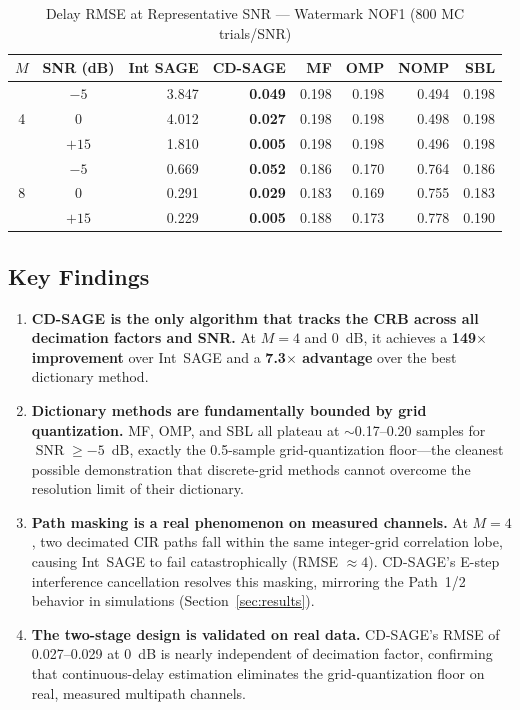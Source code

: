 \documentclass[a4paper,fleqn]{cas-dc}
\DeclareMathOperator{\SNR}{SNR}
\begin{document}
\begin{table}[width=.9\linewidth,cols=8,pos=h]
\centering
\caption{Delay RMSE at Representative SNR --- Watermark NOF1 (800 MC trials/SNR)}
\label{tab:wm}
\footnotesize
\begin{tabular}{@{}ccrrrrrr@{}}
\toprule
$M$ & SNR (dB) & Int SAGE & \textbf{CD-SAGE} & MF & OMP & NOMP & SBL \\
\midrule
\multirow{3}{*}{4} & $-5$  & 3.847 & \textbf{0.049} & 0.198 & 0.198 & 0.494 & 0.198 \\
                    & $0$   & 4.012 & \textbf{0.027} & 0.198 & 0.198 & 0.498 & 0.198 \\
                    & $+15$ & 1.810 & \textbf{0.005} & 0.198 & 0.198 & 0.496 & 0.198 \\
\midrule
\multirow{3}{*}{8} & $-5$  & 0.669 & \textbf{0.052} & 0.186 & 0.170 & 0.764 & 0.186 \\
                    & $0$   & 0.291 & \textbf{0.029} & 0.183 & 0.169 & 0.755 & 0.183 \\
                    & $+15$ & 0.229 & \textbf{0.005} & 0.188 & 0.173 & 0.778 & 0.190 \\
\bottomrule
\end{tabular}
\end{table}

\subsection{Key Findings}

\begin{enumerate}
\item \textbf{CD-SAGE is the only algorithm that tracks the CRB across all decimation factors and SNR.} At $M=4$ and \SI{0}{dB}, it achieves a \textbf{149$\times$ improvement} over Int~SAGE and a \textbf{7.3$\times$ advantage} over the best dictionary method.
\item \textbf{Dictionary methods are fundamentally bounded by grid quantization.} MF, OMP, and SBL all plateau at $\sim$0.17--0.20 samples for $\SNR \ge -5$~dB, exactly the 0.5-sample grid-quantization floor---the cleanest possible demonstration that discrete-grid methods cannot overcome the resolution limit of their dictionary.
\item \textbf{Path masking is a real phenomenon on measured channels.} At $M=4$, two decimated CIR paths fall within the same integer-grid correlation lobe, causing Int~SAGE to fail catastrophically (RMSE $\approx 4$). CD-SAGE's E-step interference cancellation resolves this masking, mirroring the Path~1/2 behavior in simulations (Section~\ref{sec:results}).
\item \textbf{The two-stage design is validated on real data.} CD-SAGE's RMSE of 0.027--0.029 at \SI{0}{dB} is nearly independent of decimation factor, confirming that continuous-delay estimation eliminates the grid-quantization floor on real, measured multipath channels.
\end{enumerate}
\end{document}
